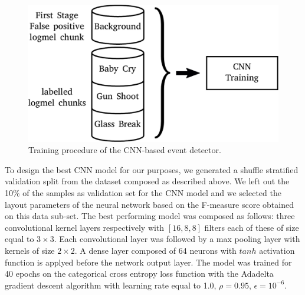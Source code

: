 \documentclass{article}
\begin{document}
\begin{sloppy}
\begin{figure}[b]
	\centering
	\includegraphics[width=\columnwidth]{Images/training_second_stage.pdf}
	\caption{Training procedure of the CNN-based event detector.}
	\label{fig:CNN-train}
\end{figure}

To design the best CNN model for our purposes, we generated a shuffle stratified validation split from the dataset composed as described above. We left out the 10\% of the samples as validation set for the CNN model and we selected the layout parameters of the neural network based on the F-measure score obtained on this data sub-set. The best performing model was composed as follows: three convolutional kernel layers respectively with $[16, 8, 8]$ filters each of these of size equal to $3\times3$. Each convolutional layer was followed by a max pooling layer with kernels of size $2\times2$. A dense layer composed of 64 neurons with $tanh$ activation function is applyed before the network output layer. The model was trained for 40 epochs on the categorical cross entropy loss function with the Adadelta gradient descent algorithm with learning rate equal to 1.0, $\rho=0.95$, $\epsilon=10^{-6}$.



\end{sloppy}
\end{document}
